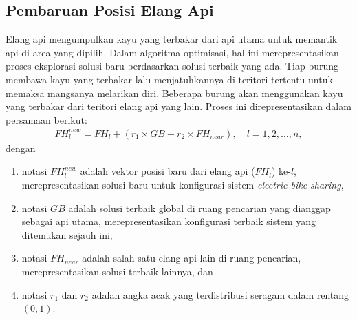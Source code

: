 \subsection{Pembaruan Posisi Elang Api}
Elang api mengumpulkan kayu yang terbakar dari api utama untuk memantik api di area yang dipilih. Dalam algoritma optimisasi, hal ini merepresentasikan proses eksplorasi solusi baru berdasarkan solusi terbaik yang ada. Tiap burung membawa kayu yang terbakar lalu menjatuhkannya di teritori tertentu untuk memaksa mangsanya melarikan diri. Beberapa burung akan menggunakan kayu yang terbakar dari teritori elang api yang lain. Proses ini direpresentasikan dalam persamaan berikut:
\begin{align}
    FH_l^{\textit{new}}=FH_l+(r_1\times GB-r_2\times FH_{\textit{near}}), \quad l=1,2,\ldots,n,
\end{align}
dengan
\begin{enumerate}
    \item notasi $FH_l^{\textit{new}}$ adalah vektor posisi baru dari elang api ($FH_l$) ke-$l$, merepresentasikan solusi baru untuk konfigurasi sistem \textit{electric bike-sharing},
    \item notasi $GB$ adalah solusi terbaik global di ruang pencarian yang dianggap sebagai api utama, merepresentasikan konfigurasi terbaik sistem yang ditemukan sejauh ini,
    \item notasi $FH_{\textit{near}}$ adalah salah satu elang api lain di ruang pencarian, merepresentasikan solusi terbaik lainnya, dan
    \item notasi $r_1$ dan $r_2$ adalah angka acak yang terdistribusi seragam dalam rentang $(0,1)$.
\end{enumerate}

